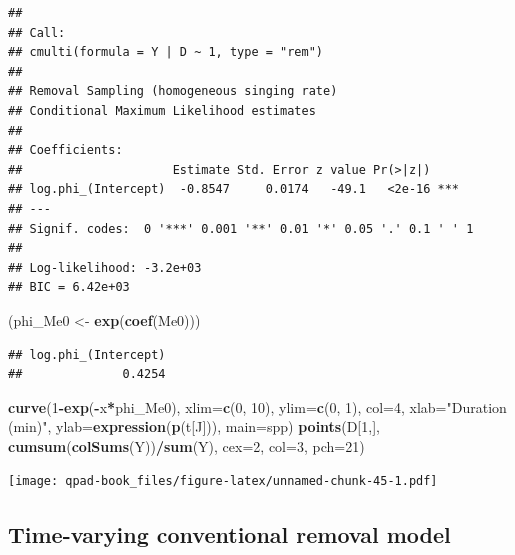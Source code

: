 \documentclass[12pt,]{book}
\newenvironment{Shaded}{\begin{snugshade}}{\end{snugshade}}
\newcommand{\DataTypeTok}[1]{\textcolor[rgb]{0.13,0.29,0.53}{#1}}
\newcommand{\DecValTok}[1]{\textcolor[rgb]{0.00,0.00,0.81}{#1}}
\newcommand{\KeywordTok}[1]{\textcolor[rgb]{0.13,0.29,0.53}{\textbf{#1}}}
\newcommand{\NormalTok}[1]{#1}
\newcommand{\OperatorTok}[1]{\textcolor[rgb]{0.81,0.36,0.00}{\textbf{#1}}}
\newcommand{\StringTok}[1]{\textcolor[rgb]{0.31,0.60,0.02}{#1}}
\begin{document}
\begin{verbatim}
## 
## Call:
## cmulti(formula = Y | D ~ 1, type = "rem")
## 
## Removal Sampling (homogeneous singing rate)
## Conditional Maximum Likelihood estimates
## 
## Coefficients:
##                     Estimate Std. Error z value Pr(>|z|)    
## log.phi_(Intercept)  -0.8547     0.0174   -49.1   <2e-16 ***
## ---
## Signif. codes:  0 '***' 0.001 '**' 0.01 '*' 0.05 '.' 0.1 ' ' 1 
## 
## Log-likelihood: -3.2e+03 
## BIC = 6.42e+03
\end{verbatim}

\begin{Shaded}
\begin{Highlighting}[]
\NormalTok{(phi_Me0 <-}\StringTok{ }\KeywordTok{exp}\NormalTok{(}\KeywordTok{coef}\NormalTok{(Me0)))}
\end{Highlighting}
\end{Shaded}

\begin{verbatim}
## log.phi_(Intercept) 
##              0.4254
\end{verbatim}

\begin{Shaded}
\begin{Highlighting}[]
\KeywordTok{curve}\NormalTok{(}\DecValTok{1}\OperatorTok{-}\KeywordTok{exp}\NormalTok{(}\OperatorTok{-}\NormalTok{x}\OperatorTok{*}\NormalTok{phi_Me0), }\DataTypeTok{xlim=}\KeywordTok{c}\NormalTok{(}\DecValTok{0}\NormalTok{, }\DecValTok{10}\NormalTok{), }\DataTypeTok{ylim=}\KeywordTok{c}\NormalTok{(}\DecValTok{0}\NormalTok{, }\DecValTok{1}\NormalTok{), }\DataTypeTok{col=}\DecValTok{4}\NormalTok{,}
  \DataTypeTok{xlab=}\StringTok{"Duration (min)"}\NormalTok{, }\DataTypeTok{ylab=}\KeywordTok{expression}\NormalTok{(}\KeywordTok{p}\NormalTok{(t[J])), }\DataTypeTok{main=}\NormalTok{spp)}
\KeywordTok{points}\NormalTok{(D[}\DecValTok{1}\NormalTok{,], }\KeywordTok{cumsum}\NormalTok{(}\KeywordTok{colSums}\NormalTok{(Y))}\OperatorTok{/}\KeywordTok{sum}\NormalTok{(Y), }\DataTypeTok{cex=}\DecValTok{2}\NormalTok{, }\DataTypeTok{col=}\DecValTok{3}\NormalTok{, }\DataTypeTok{pch=}\DecValTok{21}\NormalTok{)}
\end{Highlighting}
\end{Shaded}

\texttt{[image: qpad-book\_files/figure-latex/unnamed-chunk-45-1.pdf]}

\hypertarget{time-varying-conventional-removal-model}{%
\subsection{Time-varying conventional removal model}\label{time-varying-conventional-removal-model}}
\end{document}
